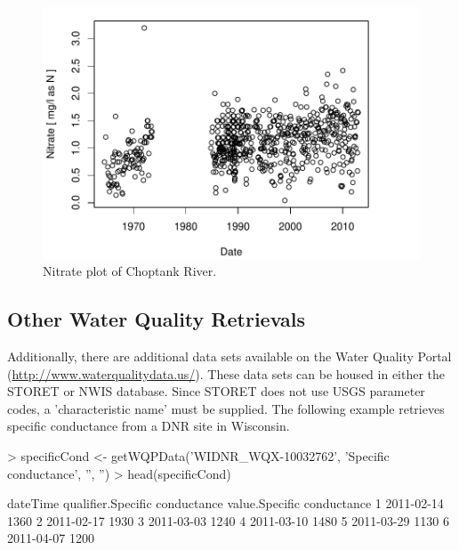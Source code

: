 \documentclass[a4paper,11pt]{article}
\begin{document}
\begin{figure}
\begin{center}
\includegraphics{dataRetrieval-fig3}
\end{center}
\caption{Nitrate plot of Choptank River.}
\end{figure}

\subsection{Other Water Quality Retrievals}
Additionally, there are additional data sets available on the Water Quality Portal (\url{http://www.waterqualitydata.us/}).  These data sets can be housed in either the STORET or NWIS database.  Since STORET does not use USGS parameter codes, a 'characteristic name' must be supplied.  The following example retrieves specific conductance from a DNR site in Wisconsin.

\begin{Schunk}
\begin{Sinput}
> specificCond <- getWQPData('WIDNR_WQX-10032762', 
         'Specific conductance', '', '')
> head(specificCond)
\end{Sinput}
\begin{Soutput}
    dateTime qualifier.Specific conductance value.Specific conductance
1 2011-02-14                                                      1360
2 2011-02-17                                                      1930
3 2011-03-03                                                      1240
4 2011-03-10                                                      1480
5 2011-03-29                                                      1130
6 2011-04-07                                                      1200
\end{Soutput}
\end{Schunk}
\end{document}
